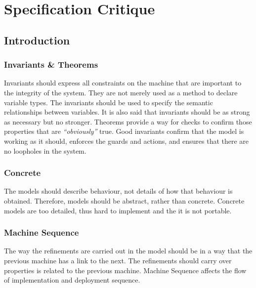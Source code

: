 
\def\mytitle{Specification Critique}
\def\myauthor{Group 03}
\def\email{se2020.grp03@cse.unsw.edu.au}
\def\mydate{05 August 2012}
\def\latexmode{article}

 \pagebreak 

 \tableofcontents 

 \pagebreak 

\chapter{Specification Critique}
\label{specificationcritique}

\section{Introduction}
\label{introduction}

\subsection{Invariants \& Theorems}
\label{invariantstheorems}

Invariants should express all constraints on the machine that are important to the integrity of the system. They are not merely used as a method to declare variable types. The invariants should be used to specify the semantic relationships between variables. It is also said that invariants should be as strong as necessary but no stronger. Theorems provide a way for checks to confirm those properties that are \emph{``obviously''} true. Good invariants confirm that the model is working as it should, enforces the guards and actions, and ensures that there are no loopholes in the system.

\subsection{Concrete}
\label{concrete}

The models should describe behaviour, not details of how that behaviour is obtained. Therefore, models should be abstract, rather than concrete. Concrete models are too detailed, thus hard to implement and the it is not portable.

\subsection{Machine Sequence}
\label{machinesequence}

The way the refinements are carried out in the model should be in a way that the previous machine has a link to the next. The refinements should carry over properties is related to the previous machine. Machine Sequence affects the flow of implementation and deployment sequence.


